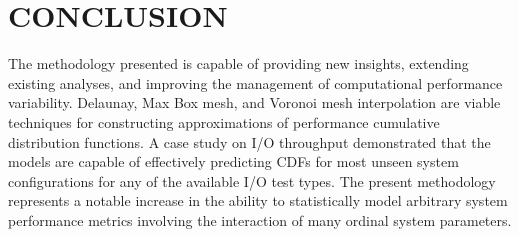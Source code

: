 \documentclass[letterpaper, 10 pt, conference]{ieeeconf}  %
\begin{document}
\section{CONCLUSION}
\label{sec:conclusion}

The methodology presented is capable of providing new insights, extending existing analyses, and improving the management of computational performance variability. Delaunay, Max Box mesh, and Voronoi mesh interpolation are viable techniques for constructing approximations of performance cumulative distribution functions. A case study on I/O throughput demonstrated that the models are capable of effectively predicting CDFs for most unseen system configurations for any of the available I/O test types. The present methodology represents a notable increase in the ability to statistically model arbitrary system performance metrics involving the interaction of many ordinal system parameters.



\end{document}
